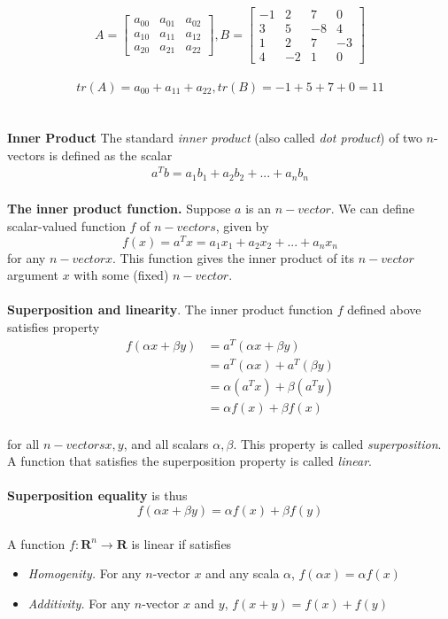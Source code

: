 \documentclass[a4paper, 12pt]{article}
\begin{document}
\\
\\
\[
A = \left[{
    \begin{array}{ccc}
    a_{00} & a_{01} & a_{02} \\
    a_{10} & a_{11} & a_{12} \\
    a_{20} & a_{21} & a_{22}
    \end{array}
}
\right]
,
B = \left[{
    \begin{array}{cccc}
    -1 &  2 &  7 &  0 \\
    3  &  5 & -8 &  4 \\
    1  &  2 &  7 & -3 \\
    4  & -2 &  1 &  0
    \end{array} 
}\right]
\]
\\
\[
tr(A) = a_{00} + a_{11} + a_{22}, 
tr(B) = -1 + 5 + 7 + 0 = 11
\]
\\
\\
\textbf{Inner Product}
The standard \textit{inner product} (also called \textit{dot product}) of 
two $n$-vectors is defined as the scalar
\begin{align*}
a^Tb = a_1b_1 + a_2b_2 + ... + a_nb_n
\end{align*}
\\
\textbf{The inner product function.} Suppose $a$ is an $n-vector$. We can define scalar-valued
function $f$ of $n-vectors$, given by
\begin{equation}
f(x) = a^Tx = a_1x_1 + a_2x_2+...+a_nx_n
\end{equation}
for any $n-vector x$. This function gives the inner product of its $n-vector$ argument $x$ with
some (fixed) $n-vector$.
\\
\\
\textbf{Superposition and linearity}. The inner product function $f$ defined above satisfies
property
\begin{align*}
f(\alpha x +\beta y) &= a^T(\alpha x + \beta y) \\
&= a^T(\alpha x) + a^T(\beta y) \\
&= \alpha(a^Tx) + \beta(a^Ty) \\
&= \alpha f(x) + \beta f(x)
\end{align*}
\\
for all $n-vectors x, y$, and all scalars $\alpha, \beta$. This property is called \textit{superposition}.
 A function that satisfies the superposition property is called \textit{linear}.
\\
\\
\textbf{Superposition equality} is thus
\begin{equation}
f(\alpha x + \beta y) = \alpha f(x) + \beta f(y)
\end{equation}
\\
A function  $ f: \mathbf{R}^n \to \mathbf{R} $ is linear if satisfies
\begin{itemize}
\item \textit{Homogenity.} For any $n$-vector $x$ and any scala $\alpha$, $f(\alpha x) = \alpha f(x)$
\item \textit{Additivity.} For any $n$-vector $x$ and $y$, $f(x + y) = f(x) + f(y)$
\end{itemize}
\end{document}
